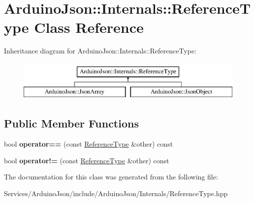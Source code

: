 \hypertarget{class_arduino_json_1_1_internals_1_1_reference_type}{}\section{Arduino\+Json\+:\+:Internals\+:\+:Reference\+Type Class Reference}
\label{class_arduino_json_1_1_internals_1_1_reference_type}
Inheritance diagram for Arduino\+Json\+:\+:Internals\+:\+:Reference\+Type\+:\begin{figure}[H]
\begin{center}
\leavevmode
\includegraphics[height=2.000000cm]{class_arduino_json_1_1_internals_1_1_reference_type}
\end{center}
\end{figure}
\subsection*{Public Member Functions}
\begin{DoxyCompactItemize}
\item 
\hypertarget{class_arduino_json_1_1_internals_1_1_reference_type_a810d0e47f100480caba6b3f23e9a5c1c}{}bool {\bfseries operator==} (const \hyperlink{class_arduino_json_1_1_internals_1_1_reference_type}{Reference\+Type} \&other) const \label{class_arduino_json_1_1_internals_1_1_reference_type_a810d0e47f100480caba6b3f23e9a5c1c}

\item 
\hypertarget{class_arduino_json_1_1_internals_1_1_reference_type_ae68ffa6faef1a7bbc79469aa3c46278a}{}bool {\bfseries operator!=} (const \hyperlink{class_arduino_json_1_1_internals_1_1_reference_type}{Reference\+Type} \&other) const \label{class_arduino_json_1_1_internals_1_1_reference_type_ae68ffa6faef1a7bbc79469aa3c46278a}

\end{DoxyCompactItemize}


The documentation for this class was generated from the following file\+:\begin{DoxyCompactItemize}
\item 
Services/\+Arduino\+Json/include/\+Arduino\+Json/\+Internals/Reference\+Type.\+hpp\end{DoxyCompactItemize}
